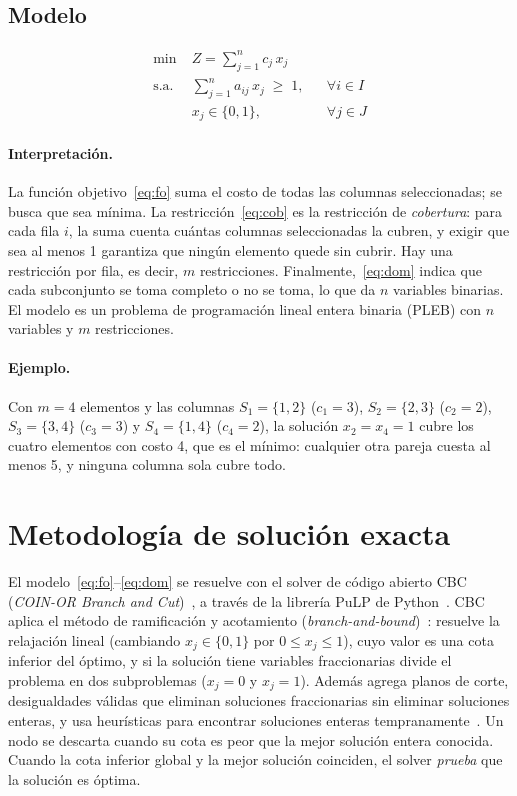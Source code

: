\documentclass[11pt,a4paper]{article}
\begin{document}
\subsection*{Modelo}
\begin{align}
\min\; & Z=\sum_{j=1}^{n} c_j\,x_j \label{eq:fo}\\
\text{s.a.}\; & \sum_{j=1}^{n} a_{ij}\,x_j \;\ge\; 1, && \forall i\in I \label{eq:cob}\\
& x_j\in\{0,1\}, && \forall j\in J \label{eq:dom}
\end{align}

\paragraph{Interpretación.} La función objetivo~\eqref{eq:fo} suma el costo de todas las columnas
seleccionadas; se busca que sea mínima. La restricción~\eqref{eq:cob} es la restricción de
\emph{cobertura}: para cada fila $i$, la suma cuenta cuántas columnas seleccionadas la cubren, y
exigir que sea al menos 1 garantiza que ningún elemento quede sin cubrir. Hay una restricción por
fila, es decir, $m$ restricciones. Finalmente,~\eqref{eq:dom} indica que cada subconjunto se toma
completo o no se toma, lo que da $n$ variables binarias. El modelo es un problema de
programación lineal entera binaria (PLEB) con $n$ variables y $m$ restricciones.

\paragraph{Ejemplo.} Con $m=4$ elementos y las columnas $S_1=\{1,2\}$ ($c_1=3$),
$S_2=\{2,3\}$ ($c_2=2$), $S_3=\{3,4\}$ ($c_3=3$) y $S_4=\{1,4\}$ ($c_4=2$), la solución
$x_2=x_4=1$ cubre los cuatro elementos con costo 4, que es el mínimo: cualquier otra pareja cuesta
al menos 5, y ninguna columna sola cubre todo.

\section{Metodología de solución exacta}
El modelo~\eqref{eq:fo}--\eqref{eq:dom} se resuelve con el solver de código abierto CBC
(\emph{COIN-OR Branch and Cut})~\citep{forrest2005cbc}, a través de la librería PuLP de
Python~\citep{mitchell2011pulp}. CBC aplica el método de ramificación y acotamiento
(\emph{branch-and-bound})~\citep{landdoig1960}: resuelve la relajación lineal (cambiando
$x_j\in\{0,1\}$ por $0\le x_j\le 1$), cuyo valor es una cota inferior del óptimo, y si la solución
tiene variables fraccionarias divide el problema en dos subproblemas ($x_j=0$ y $x_j=1$). Además
agrega planos de corte, desigualdades válidas que eliminan soluciones fraccionarias sin eliminar
soluciones enteras, y usa heurísticas para encontrar soluciones enteras
tempranamente~\citep{wolsey2020}. Un nodo se descarta cuando su cota es peor que la mejor solución
entera conocida. Cuando la cota inferior global y la mejor solución coinciden, el solver
\emph{prueba} que la solución es óptima.
\end{document}
